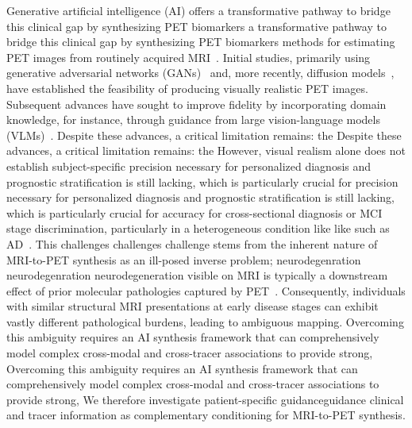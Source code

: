 \documentclass{article}
\providecommand{\DIFaddtex}[1]{{\protect\color{blue} \sf #1}} %
\providecommand{\DIFdeltex}[1]{{\protect\color{red} \ifmmode #1\else\scriptsize #1\fi}} %
\providecommand{\DIFaddbegin}{} %
\providecommand{\DIFaddend}{} %
\providecommand{\DIFdelbegin}{} %
\providecommand{\DIFdelend}{} %
\providecommand{\DIFadd}[1]{\texorpdfstring{\DIFaddtex{#1}}{#1}} %
\providecommand{\DIFdel}[1]{\texorpdfstring{\DIFdeltex{#1}}{}} %
\newcommand{\DIFscaledelfig}{0.5}
\newlength{\DIFdelgraphicswidth} %
\newlength{\DIFdelgraphicsheight} %
\newcommand{\DIFaddincludegraphics}[2][]{{\color{blue}\fbox{\DIFOincludegraphics[#1]{#2}}}} %
\newcommand{\DIFdelincludegraphics}[2][]{%
\sbox{\DIFdelgraphicsbox}{\DIFOincludegraphics[#1]{#2}}%
\settoboxwidth{\DIFdelgraphicswidth}{\DIFdelgraphicsbox} %
\settoboxtotalheight{\DIFdelgraphicsheight}{\DIFdelgraphicsbox} %
\scalebox{\DIFscaledelfig}{%
\parbox[b]{\DIFdelgraphicswidth}{\usebox{\DIFdelgraphicsbox}\\[-\baselineskip] \rule{\DIFdelgraphicswidth}{0em}}\llap{\resizebox{\DIFdelgraphicswidth}{\DIFdelgraphicsheight}{%
\setlength{\unitlength}{\DIFdelgraphicswidth}%
\begin{picture}(1,1)%
\thicklines\linethickness{2pt} %
{\color[rgb]{1,0,0}\put(0,0){\framebox(1,1){}}}%
{\color[rgb]{1,0,0}\put(0,0){\line( 1,1){1}}}%
{\color[rgb]{1,0,0}\put(0,1){\line(1,-1){1}}}%
\end{picture}%
}\hspace*{3pt}}} %
} %
\DeclareRobustCommand{\DIFaddbegin}{\DIFOaddbegin \let\includegraphics\DIFaddincludegraphics} %
\DeclareRobustCommand{\DIFaddend}{\DIFOaddend \let\includegraphics\DIFOincludegraphics} %
\DeclareRobustCommand{\DIFdelbegin}{\DIFOdelbegin \let\includegraphics\DIFdelincludegraphics} %
\DeclareRobustCommand{\DIFdelend}{\DIFOaddend \let\includegraphics\DIFOincludegraphics} %
\begin{document}
Generative artificial intelligence (AI) offers \DIFdelbegin \DIFdel{a transformative pathway to bridge this clinical gap by synthesizing PET biomarkers }\DIFdelend \DIFaddbegin \DIFadd{methods for estimating PET images }\DIFaddend from routinely acquired MRI~\cite{dayarathna2024deep,lee2024synthesizing}. Initial studies, primarily using generative adversarial networks (GANs)~\cite{pan2018synthesizing,pan2020spatially,apostolopoulos2022applications} and, more recently, diffusion models~\cite{xie2024synthesizing,chen2025multi,theodorou2025mri2pet}, have established the feasibility of producing visually realistic PET images. Subsequent advances have sought to improve fidelity by incorporating domain knowledge, for instance, through guidance from large vision-language models (VLMs)~\cite{wang2025unisyn,liu2025direct}.  \DIFdelbegin \DIFdel{Despite these advances, a critical limitation remains: the }\DIFdelend \DIFaddbegin \DIFadd{However, visual realism alone does not establish }\DIFaddend subject-specific \DIFdelbegin \DIFdel{precision necessary for personalized diagnosis and prognostic stratification is still lacking, which is particularly crucial for }\DIFdelend \DIFaddbegin \DIFadd{accuracy for cross-sectional diagnosis or MCI stage discrimination, particularly in }\DIFaddend a heterogeneous condition \DIFdelbegin \DIFdel{like }\DIFdelend \DIFaddbegin \DIFadd{such as }\DIFaddend AD~\cite{ossenkoppele2022amyloid}. This \DIFdelbegin \DIFdel{challenges }\DIFdelend \DIFaddbegin \DIFadd{challenge }\DIFaddend stems from the inherent nature of MRI-to-PET synthesis as an ill-posed inverse problem; \DIFdelbegin \DIFdel{neurodegenration }\DIFdelend \DIFaddbegin \DIFadd{neurodegeneration }\DIFaddend visible on MRI is typically a downstream effect of prior molecular pathologies captured by PET~\cite{jagust2018imaging}. Consequently, individuals with similar structural MRI presentations at early disease stages can exhibit vastly different pathological burdens, leading to ambiguous mapping. \DIFdelbegin \DIFdel{Overcoming this ambiguity requires an AI synthesis framework that can comprehensively model complex cross-modal and cross-tracer associations to provide strong, }\DIFdelend \DIFaddbegin \DIFadd{We therefore investigate }\DIFaddend patient-specific \DIFdelbegin \DIFdel{guidance}\DIFdelend \DIFaddbegin \DIFadd{clinical and tracer information as complementary conditioning for MRI-to-PET synthesis}\DIFaddend .
\end{document}
